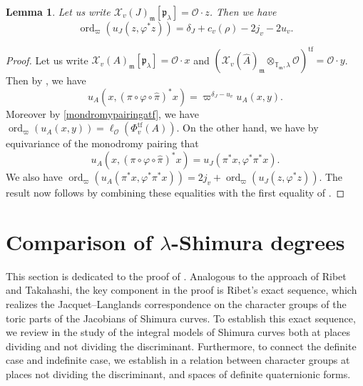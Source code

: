 \documentclass[a4paper, notitlepage, 10pt]{amsart}
\theoremstyle{plain} %
\newtheorem{lemma}[theorem]{Lemma}
\theoremstyle{definition} %
\theoremstyle{remark} %
\numberwithin{equation}{section}
\newcommand{\bbT}{\mathbb T}
\newcommand{\ord}{\operatorname{ord}} %
\newcommand{\tf}{\operatorname{tf}} %
\begin{document}
\begin{lemma}\label{scalartoShimuradeg}
    Let us write $\mathcal{X}_v(J)_{\mathfrak{m}}[\mathfrak{p}_\lambda]=\mathcal{O}\cdot z$. Then we have
    $$ \ord_{\varpi}(u_J(z,\varphi^*z))=\delta_J +c_v(\rho)- 2j_v-2u_v.$$
\end{lemma}
\begin{proof}
    Let us write $\mathcal{X}_v(A)_{\mathfrak{m}}[\mathfrak{p}_\lambda]=\mathcal{O}\cdot x$ and $(\mathcal{X}_v(\hat{A})_{\mathfrak{m}}\otimes_{\bbT_{\mathfrak{m}},\lambda}\mathcal{O})^{\tf}=\mathcal{O}\cdot y$. Then by , we have
    $$ u_A(x,(\pi\circ \varphi \circ \hat{\pi})^*x)=\varpi^{\delta_J -u_v}u_A(x,y). $$
    Moreover by \eqref{mondromypairingatf}, we have $\ord_{\varpi}(u_A(x,y))=\ell_{\mathcal{O}}(\Phi^{\tf}_v(A))$. On the other hand, we have by equivariance of the monodromy pairing that 
    $$ u_A(x,(\pi\circ \varphi \circ \hat{\pi})^*x)=u_J(\pi^*x,\varphi^*\pi^*x).$$
    We also have $\ord_{\varpi}(u_A(\pi^*x,\varphi^*\pi^*x))=2j_v+ \ord_{\varpi}(u_J(z,\varphi^*z))$. The result now follows by combining these equalities with the first equality of .
\end{proof}
\section{Comparison of $\lambda$-Shimura degrees}\label{complambdashimura}
This section is dedicated to the proof of . Analogous to the approach of Ribet and Takahashi, the key component in the proof is Ribet’s exact sequence, which realizes the Jacquet--Langlands correspondence on the character groups of the toric parts of the Jacobians of Shimura curves. To establish this exact sequence, we review in  the study of the integral models of Shimura curves both at places dividing and not dividing the discriminant. Furthermore, to connect the definite case and indefinite case, we establish in  a relation between character groups at places not dividing the discriminant, and spaces of definite quaternionic forms. 
\end{document}
